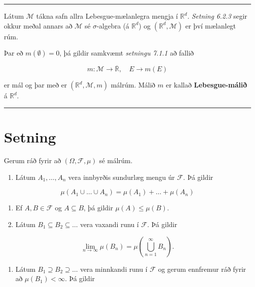 \documentclass[]{book}
\providecommand{\tightlist}{%
  \setlength{\itemsep}{0pt}\setlength{\parskip}{0pt}}
\begin{document}
\begin{center}\rule{0.5\linewidth}{\linethickness}\end{center}

Látum \(\mathcal M\) tákna safn allra Lebesgue-mælanlegra mengja í \(\mathbb R^d\). \emph{Setning 6.2.3} segir okkur meðal annars að \(\mathcal M\) sé \(\sigma\)-algebra (á \(\mathbb R^d\)) og \((\mathbb R^d, \mathcal M)\) er því mælanlegt rúm.

Þar eð \(m(\emptyset) = 0\), þá gildir samkvæmt \emph{setningu 7.1.1} að fallið

\[
m: \mathcal M \rightarrow \overline{\mathbb R}, \quad E \rightarrow m(E)
\]

er mál og þar með er \((\mathbb R^d, \mathcal M, m)\) málrúm. Málið \(m\) er kallað \textbf{Lebesgue-málið} á \(\mathbb R^d\).

\begin{center}\rule{0.5\linewidth}{\linethickness}\end{center}

\hypertarget{setning-27}{%
\section{Setning}\label{setning-27}}

Gerum ráð fyrir að \((\Omega,\mathcal F, \mu)\) sé málrúm.

\begin{enumerate}
\def\labelenumi{\arabic{enumi}.}
\tightlist
\item
  Látum \(A_1, \dots, A_n\) vera innbyrðis sundurlæg mengu úr \(\mathcal F\). Þá gildir
\end{enumerate}

\[
\mu(A_1 \cup \dots \cup A_n) = \mu(A_1) + \dots + \mu(A_n)
\]

\begin{enumerate}
\def\labelenumi{\arabic{enumi}.}
\setcounter{enumi}{1}
\item
  Ef \(A, B \in \mathcal F\) og \(A \subseteq B\), þá gildir \(\mu(A) \leq \mu(B)\).
\item
  Látum \(B_1 \subseteq B_2 \subseteq \dots\) vera vaxandi runu í \(\mathcal F\). Þá gildir
\end{enumerate}

\[
\lim_{n\rightarrow\infty}\mu(B_n) = \mu\left(\bigcup_{n=1}^\infty B_n\right).
\]

\begin{enumerate}
\def\labelenumi{\arabic{enumi}.}
\setcounter{enumi}{3}
\tightlist
\item
  Látum \(B_1 \supseteq B_2 \supseteq \dots\) vera minnkandi runu í \(\mathcal F\) og gerum ennfremur ráð fyrir að \(\mu(B_1) < \infty\). Þá gildir
\end{enumerate}
\end{document}
